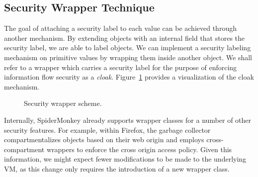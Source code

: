 \documentclass[11pt,onecolumn]{article}
\newcommand{\todo}[1]{\textcolor{red}{#1}}
\begin{document}
\subsection{Security Wrapper Technique}\label{sec:cloaks}

The goal of attaching a security label to each value can be achieved through another mechanism.
By extending objects with an internal field that stores the security label, we are able to label objects.
We can implement a security labeling mechanism on primitive values by wrapping them inside another object.
We shall refer to a wrapper which carries a security label for the purpose of enforcing information flow security as a \emph{cloak}.
Figure~\ref{fig:security-wrapper} provides a visualization of the cloak mechanism.

\begin{figure}[h]
 \centering
{}
 \caption{Security wrapper scheme.}
 \label{fig:security-wrapper}
\end{figure}

Internally, SpiderMonkey already supports wrapper classes for a number of other security features.
For example, within Firefox, the garbage collector compartmentalizes objects based on their web origin and employs cross-compartment wrappers to enforce the cross origin access policy\cite{wagner2011}.
Given this information, we might expect fewer modifications to be made to the underlying VM, as this change only requires the introduction of a new wrapper class.
\end{document}

